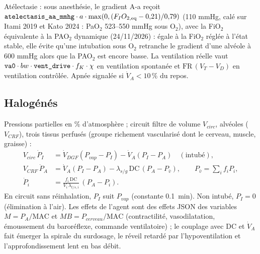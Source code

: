 \documentclass[10pt,a4paper]{article}
\newcommand{\vp}[1]{\text{\texttt{\detokenize{#1}}}}
\begin{document}
Atélectasie : sous anesthésie, le gradient A-a reçoit $\vp{atelectasis_aa_mmhg}\cdot a\cdot\max(0, (F_IO_{2,\mathrm{eq}} - 0{,}21)/0{,}79)$ (110 mmHg, calé sur Itami 2019 et Kato 2024 : PaO$_2$ 523–550 mmHg sous O$_2$), avec la FiO$_2$ équivalente à la PAO$_2$ dynamique (24/11/2026) : égale à la FiO$_2$ réglée à l'état stable, elle évite qu'une intubation sous O$_2$ retranche le gradient d'une alvéole à 600 mmHg alors que la PAO$_2$ est encore basse. La ventilation réelle vaut $\vp{va0}\cdot bw\cdot\vp{vent_drive}\cdot f_K\cdot\chi$ en ventilation spontanée
et $\mathrm{FR}\,(V_T - V_D)$ en ventilation contrôlée. Apnée signalée si $\dot V_A < 10\,\%$ du repos.

\subsection{Halogénés}
Pressions partielles en \% d'atmosphère ; circuit filtre de volume $V_{circ}$, alvéoles ($V_{CRF}$), trois tissus perfusés
(groupe richement vascularisé dont le cerveau, muscle, graisse) :
\begin{align*}
V_{circ}\,\dot P_I &= \dot V_{DGF}(P_{vap} - P_I) - \dot V_A(P_I - P_A) \quad(\text{intubé}),\\
V_{CRF}\,\dot P_A &= \dot V_A(P_I - P_A) - \lambda_{s/g}\,\mathrm{DC}\,(P_A - P_{\bar v}), \qquad P_{\bar v} = \textstyle\sum_i f_i P_i,\\
\dot P_i &= \frac{f_i\,\mathrm{DC}}{V_i\,\lambda_{t/s,i}}\,(P_A - P_i).
\end{align*}
En circuit sans réinhalation, $P_I$ suit $P_{vap}$ (constante \SI{0,1}{min}). Non intubé, $P_I = 0$ (élimination à l'air).
Les effets de l'agent sont des effets JSON des variables $M = P_A/\mathrm{MAC}$ et $MB = P_{cerveau}/\mathrm{MAC}$ (contractilité, vasodilatation,
émoussement du baroréflexe, commande ventilatoire) ; le couplage avec
DC et $\dot V_A$ fait émerger la spirale du surdosage, le réveil retardé par l'hypoventilation et l'approfondissement lent en bas débit.
\end{document}
